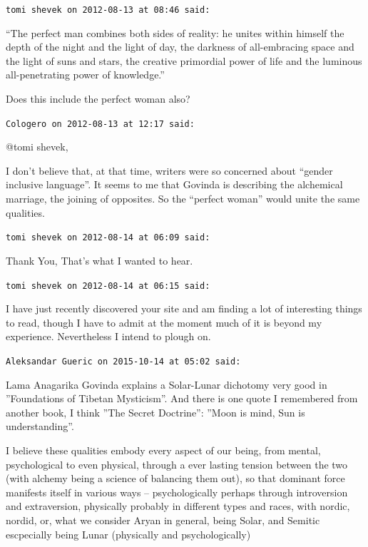 \begin{footnotesize}
\begin{sffamily}
\texttt{tomi shevek on 2012-08-13 at 08:46 said:}

``The perfect man combines both sides of reality: he unites within himself the depth of the night and the light of day, the darkness of all-embracing space and the light of suns and stars, the creative primordial power of life and the luminous all-penetrating power of knowledge.''

Does this include the perfect woman also?

\hfill

\texttt{Cologero on 2012-08-13 at 12:17 said:}

@tomi shevek,

I don't believe that, at that time, writers were so concerned about ``gender inclusive language''. It seems to me that Govinda is describing the alchemical marriage, the joining of opposites. So the ``perfect woman'' would unite the same qualities.

\hfill

\texttt{tomi shevek on 2012-08-14 at 06:09 said:}

Thank You, That's what I wanted to hear.

\hfill

\texttt{tomi shevek on 2012-08-14 at 06:15 said:}

I have just recently discovered your site and am finding a lot of interesting things to read, though I have to admit at the moment much of it is beyond my experience. Nevertheless I intend to plough on.

\hfill

\texttt{Aleksandar Gueric on 2015-10-14 at 05:02 said:}

Lama Anagarika Govinda explains a Solar-Lunar dichotomy very good in ''Foundations of Tibetan Mysticism''. And there is one quote I remembered from another book, I think ''The Secret Doctrine'': ''Moon is mind, Sun is understanding''.

I believe these qualities embody every aspect of our being, from mental, psychological to even physical, through a ever lasting tension between the two (with alchemy being a science of balancing them out), so that dominant force manifests itself in various ways -- psychologically perhaps through introversion and extraversion, physically probably in different types and races, with nordic, nordid, or, what we consider Aryan in general, being Solar, and Semitic escpecially being Lunar (physically and psychologically)


\end{sffamily}
\end{footnotesize}
